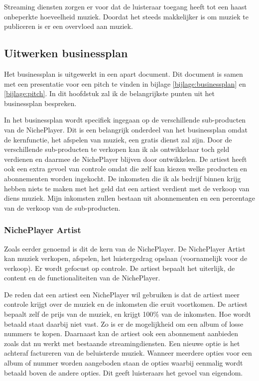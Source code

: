 Streaming diensten zorgen er voor dat de luisteraar toegang heeft tot een haast onbeperkte hoeveelheid muziek. Doordat het steeds makkelijker is om muziek te publiceren is er een overvloed aan muziek. 

\subsection {Uitwerken businessplan}

Het businessplan is uitgewerkt in een apart document. Dit document is samen met een presentatie voor een pitch te vinden in bijlage \ref{bijlage:businessplan} en \ref{bijlage:pitch}. In dit hoofdstuk zal ik de belangrijkste punten uit het businessplan bespreken.

In het businessplan wordt specifiek ingegaan op de verschillende sub-producten van de NichePlayer. Dit is een belangrijk onderdeel van het businessplan omdat de kernfunctie, het afspelen van muziek, een gratis dienst zal zijn. Door de verschillende sub-producten te verkopen kan ik als ontwikkelaar toch geld verdienen en daarmee de NichePlayer blijven door ontwikkelen. De artiest heeft ook een extra gevoel van controle omdat die zelf kan kiezen welke producten en abonnementen worden ingekocht. De inkomsten die ik als bedrijf binnen krijg hebben niets te maken met het geld dat een artiest verdient met de verkoop van diens muziek. Mijn inkomsten zullen bestaan uit abonnementen en een percentage van de verkoop van de sub-producten.

\subsubsection*{NichePlayer Artist}
Zoals eerder genoemd is dit de kern van de NichePlayer. De NichePlayer Artist kan muziek verkopen, afspelen, het luistergedrag opslaan (voornamelijk voor de verkoop). Er wordt gefocust op controle. De artiest bepaalt het uiterlijk, de content en de functionaliteiten van de NichePlayer.

De reden dat een artiest een NichePlayer wil gebruiken is dat de artiest meer controle krijgt over de muziek en de inkomsten die eruit voortkomen. De artiest bepaalt zelf de prijs van de muziek, en krijgt 100\% van de inkomsten. Hoe wordt betaald staat daarbij niet vast. Zo is er de mogelijkheid om een album of losse nummers te kopen. Daarnaast kan de artiest ook een abonnement aanbieden zoals dat nu werkt met bestaande streamingdiensten. Een nieuwe optie is het achteraf factureren van de beluisterde muziek. Wanneer meerdere opties voor een album of nummer worden aangeboden staan de opties waarbij eenmalig wordt betaald boven de andere opties. Dit geeft luisteraars het gevoel van eigendom.

